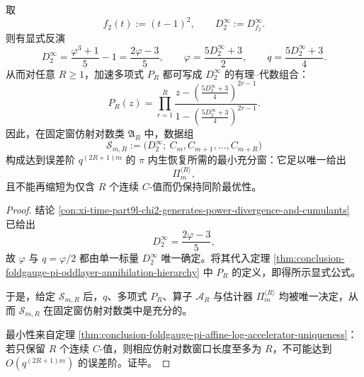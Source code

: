 \begin{theorem}\label{thm:conclusion-foldgauge-pi-selfcalibrated-minimal-window}
取
\[
f_2(t):=(t-1)^2,
\qquad
D_2^\infty:=D_{f_2}^\infty.
\]
则有显式反演
\[
D_2^\infty=\frac{\varphi^3+1}{5}-1=\frac{2\varphi-3}{5},
\qquad
\varphi=\frac{5D_2^\infty+3}{2},
\qquad
q=\frac{5D_2^\infty+3}{4}.
\]
从而对任意 \(R\ge 1\)，加速多项式 \(P_R\) 都可写成 \(D_2^\infty\) 的有理--代数组合：
\[
P_R(z)
=
\prod_{r=1}^{R}
\frac{
z-\left(\frac{5D_2^\infty+3}{4}\right)^{2r-1}
}{
1-\left(\frac{5D_2^\infty+3}{4}\right)^{2r-1}
}.
\]
因此，在固定窗仿射对数类 \(\mathfrak A_R\) 中，数据组
\[
\mathcal S_{m,R}
:=
\bigl(D_2^\infty;\ C_m,C_{m+1},\dots,C_{m+R}\bigr)
\]
构成达到误差阶 \(q^{(2R+1)m}\) 的 \(\pi\) 内生恢复所需的最小充分窗：它足以唯一给出
\[
\Pi_m^{\langle R\rangle},
\]
且不能再缩短为仅含 \(R\) 个连续 \(C\)-值而仍保持同阶最优性。
\end{theorem}
\begin{proof}
结论 \ref{con:xi-time-part9l-chi2-generates-power-divergence-and-cumulants} 已给出
\[
D_2^\infty=\frac{2\varphi-3}{5},
\]
故 \(\varphi\) 与 \(q=\varphi/2\) 都由单一标量 \(D_2^\infty\) 唯一确定。将其代入定理 \ref{thm:conclusion-foldgauge-pi-oddlayer-annihilation-hierarchy} 中 \(P_R\) 的定义，即得所示显式公式。

于是，给定 \(\mathcal S_{m,R}\) 后，\(q\)、多项式 \(P_R\)、算子 \(\mathcal A_R\) 与估计器 \(\Pi_m^{\langle R\rangle}\) 均被唯一决定，从而 \(\mathcal S_{m,R}\) 在固定窗仿射对数类中是充分的。

最小性来自定理 \ref{thm:conclusion-foldgauge-pi-affine-log-accelerator-uniqueness}：若只保留 \(R\) 个连续 \(C\)-值，则相应仿射对数窗口长度至多为 \(R\)，不可能达到 \(O(q^{(2R+1)m})\) 的误差阶。证毕。
\end{proof}

